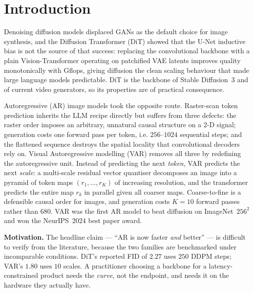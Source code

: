 \documentclass[conference]{IEEEtran}
\begin{document}
\section{Introduction}

Denoising diffusion models \cite{ho2020ddpm,song2021ddim} displaced GANs as the default
choice for image synthesis, and the Diffusion Transformer (DiT) \cite{peebles2023dit}
showed that the U-Net inductive bias is not the source of that success: replacing the
convolutional backbone with a plain Vision-Transformer operating on patchified VAE latents
improves quality monotonically with Gflops, giving diffusion the clean scaling behaviour
that made large language models predictable. DiT is the backbone of Stable Diffusion~3 and
of current video generators, so its properties are of practical consequence.

Autoregressive (AR) image models took the opposite route. Raster-scan token prediction
\cite{esser2021vqgan} inherits the LLM recipe directly but suffers from three defects: the
raster order imposes an arbitrary, unnatural causal structure on a 2-D signal; generation
costs one forward pass per token, i.e. $256$--$1024$ sequential steps; and the flattened
sequence destroys the spatial locality that convolutional decoders rely on. Visual
Autoregressive modelling (VAR) \cite{tian2024var} removes all three by redefining the
autoregressive unit. Instead of predicting the next \emph{token}, VAR predicts the next
\emph{scale}: a multi-scale residual vector quantiser decomposes an image into a pyramid of
token maps $(r_1,\dots,r_K)$ of increasing resolution, and the transformer predicts the
entire map $r_k$ in parallel given all coarser maps. Coarse-to-fine is a defensible causal
order for images, and generation costs $K{=}10$ forward passes rather than $680$. VAR was
the first AR model to beat diffusion on ImageNet~$256^2$ and won the NeurIPS~2024 best
paper award.

\textbf{Motivation.} The headline claim --- ``AR is now faster \emph{and} better'' --- is
difficult to verify from the literature, because the two families are benchmarked under
incomparable conditions. DiT's reported FID of $2.27$ uses $250$ DDPM steps; VAR's $1.80$
uses $10$ scales. A practitioner choosing a backbone for a latency-constrained product
needs the \emph{curve}, not the endpoint, and needs it on the hardware they actually have.
\end{document}
